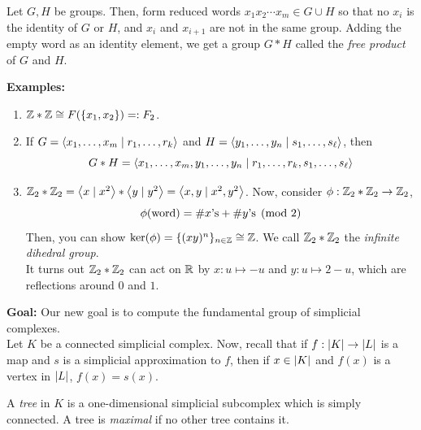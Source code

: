 \begin{definition}
    Let $G, H$ be groups. Then, form reduced words $x_1x_2\cdots x_m \in G \cup H$ so that no $x_i$ is the identity of $G$ or $H$, and $x_i$ and $x_{i + 1}$ are not in the same group. Adding the empty word as an identity element, we get a group $G * H$ called the \emph{free product} of $G$ and $H$.
\end{definition}

\textbf{Examples:}
\begin{enumerate}
    \item $\Z * \Z \cong F(\{x_1, x_2\}) =: F_2$.
    \item If $G = \brac{x_1, \ldots, x_m \mid r_1, \ldots, r_k}$ and $H = \brac{y_1, \ldots, y_n \mid s_1, \ldots, s_{\ell}}$, then
    \[ G * H = \brac{x_1, \ldots, x_m, y_1, \ldots, y_n \mid r_1, \ldots, r_k, s_1, \ldots, s_{\ell}} \]
    \item $\Z_2 * \Z_2 = \brac{x \mid x^2} * \brac{y \mid y^2} = \brac{x, y \mid x^2, y^2}$. Now, consider $\phi : \Z_2 * \Z_2 \to \Z_2$,
    \[ \phi(\tt{word}) = \#x\tt{'s} + \#y\tt{'s} \pmod 2 \]
    Then, you can show $\ker(\phi) = \{(xy)^{n}\}_{n \in \Z} \cong \Z$. We call $\Z_2 * \Z_2$ the \emph{infinite dihedral group}.\\

    It turns out $\Z_2 * \Z_2$ can act on $\R$ by $x : u \mapsto -u$ and $y : u \mapsto 2 - u$, which are reflections around $0$ and $1$.
\end{enumerate}

\textbf{Goal:} Our new goal is to compute the fundamental group of simplicial complexes.\\

Let $K$ be a connected simplicial complex. Now, recall that if $f : \abs{K} \to \abs{L}$ is a map and $s$ is a simplicial approximation to $f$, then if $x \in \abs{K}$ and $f(x)$ is a vertex in $\abs{L}$, $f(x) = s(x)$.

\begin{definition}
    A \emph{tree} in $K$ is a one-dimensional simplicial subcomplex which is simply connected. A tree is \emph{maximal} if no other tree contains it.
\end{definition}

